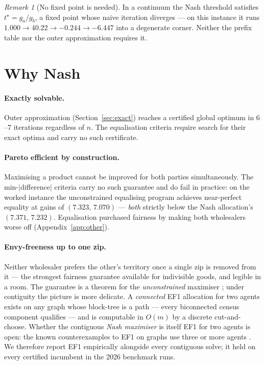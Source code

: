 \documentclass[11pt]{article}
\theoremstyle{remark}\newtheorem*{remark}{Remark}
\begin{document}
\begin{remark}[No fixed point is needed]
In a continuum the Nash threshold satisfies $t^\star=g_a/g_b$, a fixed point whose
naive iteration diverges --- on this instance it runs
$1.000\to40.22\to-0.244\to-6.447$ into a degenerate corner. Neither the prefix table nor
the outer approximation requires it.
\end{remark}

\section{Why Nash}\label{sec:why}
\paragraph{Exactly solvable.} Outer approximation (Section~\ref{sec:exact}) reaches a
certified global optimum in $6$--$7$ iterations regardless of $n$. The equalisation
criteria require search for their exact optima and carry no such certificate.

\paragraph{Pareto efficient by construction.} Maximising a product cannot be improved
for both parties simultaneously. The min-$|$difference$|$ criteria carry no such
guarantee and do fail in practice: on the worked instance the unconstrained equalising
program achieves near-perfect equality at gains of $(7.323,\,7.070)$ --- \emph{both}
strictly below the Nash allocation's $(7.371,\,7.232)$. Equalisation purchased fairness
by making both wholesalers worse off (Appendix~\ref{app:other}).

\paragraph{Envy-freeness up to one zip.} Neither wholesaler prefers the other's
territory once a single zip is removed from it --- the strongest fairness guarantee
available for indivisible goods, and legible in a room. The guarantee is a theorem for
the \emph{unconstrained} maximiser \citep{caragiannis2019}; under contiguity the picture
is more delicate. A \emph{connected} EF1 allocation for two agents exists on any graph
whose block-tree is a path \citep[Thm.~3.10]{bilo2022} --- every biconnected census
component qualifies --- and is computable in $O(m)$ by a discrete cut-and-choose.
Whether the contiguous \emph{Nash maximiser} is itself EF1 for two agents is open: the
known counterexamples to EF1 on graphs use three or more agents
\citep{igarashipeters2019}. We therefore report EF1 empirically alongside every
contiguous solve; it held on every certified incumbent in the 2026 benchmark runs.
\end{document}
